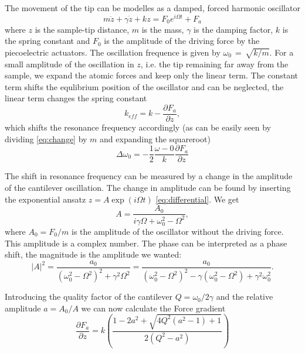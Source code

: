 \documentclass[a4paper,twoside,11pt]{scrartcl}
\begin{document}
The movement of the tip can be modelles as a damped, forced harmonic oscillator
\begin{equation}
m\ddot{z}+\gamma \dot{z}+kz=F_{0}e^{i\Omega t}+F_{a} \label{eq:differential}
\end{equation}
where $z$ is the sample-tip distance, $m$ is the mass, $\gamma$ is the damping factor, $k$ is the spring constant and $F_0$ is the amplitude of the driving force by the piecoelectric actuators. The oscillation frequence is given by $\omega_0\,=\,\sqrt{k/m}$. For a small amplitude of the oscillation in $z$, i.e. the tip remaining far away from the sample, we expand the atomic forces and keep only the linear term. The constant term shifts the equlibrium position of the oscillator and can be neglected, the linear term changes the spring constant
\begin{equation}
k_{eff}=k-\frac{\partial F_{a}}{\partial z} \label{eq:change},
\end{equation}
which shifts the resonance frequency accordingly (as can be easily seen by dividing \eqref{eq:change} by $m$ and expanding the squareroot)
\begin{equation}
\Delta \omega_0 = -\frac{1}{2} \frac{\omega-0}{k} \frac{\partial F_{a}}{\partial z}
\end{equation}

The shift in resonance frequency can be measured by a change in the amplitude of the cantilever oscillation. The change in amplitude can be found by inserting the exponential ansatz $z=A\exp\left(i\Omega t\right)$ \eqref{eq:differential}. We get
\begin{equation}
A=\frac{A_{0}}{i\gamma\Omega+\omega_{0}^{2}-\Omega^{2}},
\end{equation}
where $A_0=F_0/m$ is the amplitude of the oscillator without the driving force. This amplitude is a complex number. The phase can be interpreted as a phase shift, the magnitude is the amplitude we wanted:
\begin{equation}
|A|^{2}=\frac{a_{0}}{(\omega_{0}^{2}-\Omega^{2})^{2}+\gamma^{2}\Omega^{2}}=\frac{a_{0}}{(\omega_{0}^{2}-\Omega^{2})^{2}-\gamma(\omega_{0}^{2}-\Omega^{2})+\gamma^{2}\omega_{0}^{2}}.
\end{equation}

Introducing the quality factor of the cantilever $Q=\omega_0/2\gamma$ and the relative amplitude $a=A_0/A$ we can now calculate the Force gradient
\begin{equation}
\frac{\partial F_{a}}{\partial z}=k\left(\frac{1-2a^{2}+\sqrt{4Q^{2}\left(a^{2}-1\right)+1}}{2\left(Q^{2}-a^{2}\right)}\right)
\end{equation}
\end{document}
